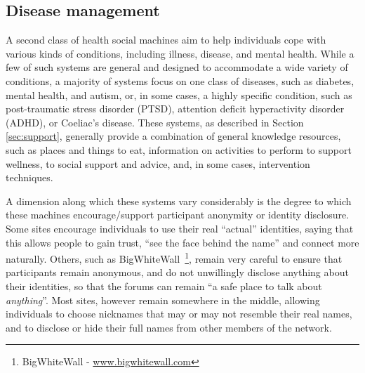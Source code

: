 \documentclass{sig-alternate}
\begin{document}
\subsection{Disease management}

A second class of health social machines aim to help individuals cope
with various kinds of conditions, including illness, disease, and
mental health.  While a few of such systems are general and designed
to accommodate a wide variety of conditions, a majority of systems
focus on one class of diseases, such as diabetes, mental health, and
autism, or, in some cases, a highly specific condition, such as
post-traumatic stress disorder (PTSD), attention deficit hyperactivity
disorder (ADHD), or Coeliac's disease.  These systems, as described in
Section \ref{sec:support}, generally provide a combination of
general knowledge resources, such as places and things to eat,
information on activities to perform to support wellness, to social
support and advice, and, in some cases, intervention techniques.

A dimension along which these systems vary considerably is the degree
to which these machines encourage/support participant anonymity or
identity disclosure.  Some sites encourage individuals to use their
real ``actual'' identities, saying that this allows people to gain
trust, ``see the face behind the name'' and connect more naturally.
Others, such as BigWhiteWall~\footnote{BigWhiteWall - \url{www.bigwhitewall.com}}, remain very careful to ensure that
participants remain anonymous, and do not unwillingly disclose
anything about their identities, so that the forums can remain ``a
safe place to talk about \emph{anything}''.  Most sites, however
remain somewhere in the middle, allowing individuals to choose
nicknames that may or may not resemble their real names, and to
disclose or hide their full names from other members of the network.
\end{document}
